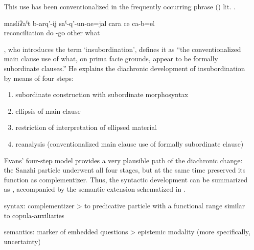 This use has been conventionalized in the frequently occurring phrase  ()  lit.  .
%
\begin{exe}
	\ex	\label{ex:He came out to reconcile them or so or there is something else}
	\gll	masliʡaˁt	b-arq'-ij	saˁ-q'-un-ne=jal	cara	ce	ca-b=el\\
		reconciliation	do	-go	other	what	\\
	\glt	{}
\end{exe}

\citep[367]{Evans2007}, who introduces the term `insubordination', defines it as ``the conventionalized main clause use of what, on prima facie grounds, appear to be formally subordinate clauses.'' He explains the diachronic development of insubordination by means of four steps:
\begin{enumerate}
\item subordinate construction with subordinate morphosyntax
\item ellipsis of main clause
\item restriction of interpretation of ellipsed material
\item reanalysis (conventionalized main clause use of formally subordinate clause)
\end{enumerate}
Evans' four-step model provides a very plausible path of the diachronic change: the Sanzhi particle underwent all four stages, but at the same time preserved its function as complementizer. Thus, the syntactic development can be summarized as , accompanied by the semantic extension schematized in .

\begin{exe}
	\ex	 \label{ex:complementizer}
		syntax: complementizer > to predicative particle with a functional range similar to copula-auxiliaries 
\end{exe}

\begin{exe}
	\ex	 \label{ex:complementizer2}
	semantics: marker of embedded questions > epistemic modality (more specifically, uncertainty)
\end{exe}

